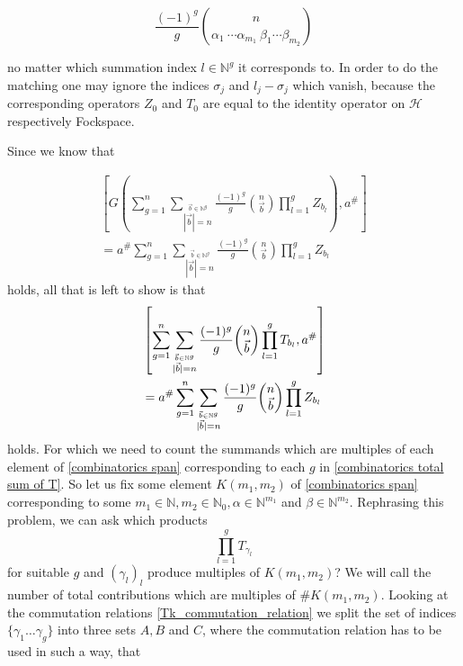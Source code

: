 \documentclass[b5paper,draft,openbib,12pt]{memoir}
\begin{document}
\begin{equation}
\frac{(-1)^g}{g} \binom{n}{\alpha_1 \ \cdots \alpha_{m_1} \ \beta_1 \cdots \beta_{m_2}}
\end{equation}

no matter which summation index \(l\in\mathbb{N}^g\) it corresponds to. In order
to do the matching one may ignore the indices \(\sigma_j\) and \(l_j-\sigma_j\) 
which vanish, because the corresponding operators \(Z_0\) and \(T_0\) are equal to
the identity operator on \(\mathcal{H}\) respectively Fockspace. 

Since we know that 

\begin{align*}
\left[ G\left(\sum_{g=1}^n \sum_{\stackrel{\vec{b}\in\mathbb{N}^g}{|\vec{b}|=n}}\frac{(-1)^g}{g} 
\binom{n}{\vec{b}}  \prod_{l=1}^g Z_{b_l}\right), a^\#\right]\\
= a^\# \sum_{g=1}^n \sum_{\stackrel{\vec{b}\in\mathbb{N}^g}{|\vec{b}|=n}}\frac{(-1)^g}{g} 
\binom{n}{\vec{b}}  \prod_{l=1}^g Z_{b_l}
\end{align*}
holds, all that is left to show is that 
\begin{align}\label{combinatorics total commutator}
&\left[\sum_{g=1}^n \sum_{\stackrel{\vec{b}\in\mathbb{N}^g}{|\vec{b}|=n}}\frac{(-1)^g}{g} 
\binom{n}{\vec{b}} \prod_{l=1}^g T_{b_l}, a^\#\right]\\\notag
&= a^\# \sum_{g=1}^n \sum_{\stackrel{\vec{b}\in\mathbb{N}^g}{|\vec{b}|=n}}\frac{(-1)^g}{g} 
\binom{n}{\vec{b}}  \prod_{l=1}^g Z_{b_l}
\end{align}
holds. For which we need to count the summands which are multiples of each element of \eqref{combinatorics span}
 corresponding to each \(g\) in \eqref{combinatorics total sum of T}. So let us fix some element
 \(K(m_1,m_2)\) of \eqref{combinatorics span} corresponding to some \(m_1\in\mathbb{N},
 m_2\in\mathbb{N}_0, \alpha \in \mathbb{N}^{m_1}\) and \( \beta\in \mathbb{N}^{m_2}\).
Rephrasing this problem, we can ask which products
\begin{equation}
\prod_{l=1}^g T_{\gamma_l}
\end{equation}
 for suitable \(g\) and \((\gamma_l)_l\) produce multiples of \(K(m_1,m_2)\)? We will call the number of 
 total contributions which are multiples of \(\#K(m_1,m_2)\).  Looking at the commutation relations 
\eqref{Tk_commutation_relation} we split the set of indices \(\{\gamma_1\dots \gamma_g\}\) into
three sets \(A,B\) and \(C\), where the commutation relation has to be used in such a way, that
\end{document}
